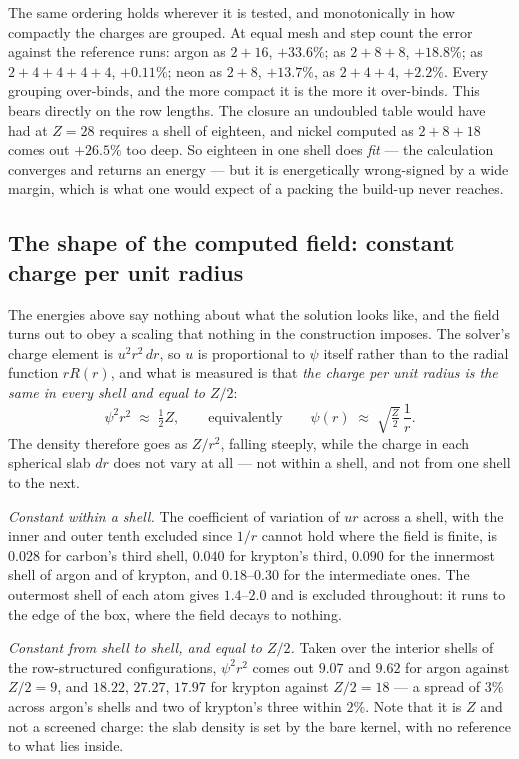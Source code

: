 \documentclass[11pt]{article}
\begin{document}
The same ordering holds wherever it is tested, and monotonically in how compactly the charges are
grouped. At equal mesh and step count the error against the reference runs: argon as $2{+}16$,
$+33.6\%$; as $2{+}8{+}8$, $+18.8\%$; as $2{+}4{+}4{+}4{+}4$, $+0.11\%$; neon as $2{+}8$, $+13.7\%$,
as $2{+}4{+}4$, $+2.2\%$. Every grouping over-binds, and the more compact it is the more it over-binds.
This bears directly on the row lengths. The closure an undoubled table would have had at $Z=28$
requires a shell of eighteen, and nickel computed as $2{+}8{+}18$ comes out $+26.5\%$ too deep. So
eighteen in one shell does \emph{fit} --- the calculation converges and returns an energy --- but it
is energetically wrong-signed by a wide margin, which is what one would expect of a packing the
build-up never reaches.

\subsection{The shape of the computed field: constant charge per unit radius}\label{sec:psiscale}

The energies above say nothing about what the solution looks like, and the field turns out to obey a
scaling that nothing in the construction imposes. The solver's charge element is $u^2r^2\,dr$, so $u$
is proportional to $\psi$ itself rather than to the radial function $rR(r)$, and what is measured is
that \emph{the charge per unit radius is the same in every shell and equal to $Z/2$}:
\[
\psi^2 r^2 \;\approx\; \tfrac12 Z ,
\qquad\text{equivalently}\qquad
\psi(r) \;\approx\; \sqrt{\tfrac{Z}{2}}\,\frac1r .
\]
The density therefore goes as $Z/r^2$, falling steeply, while the charge in each spherical slab
$dr$ does not vary at all --- not within a shell, and not from one shell to the next.

\emph{Constant within a shell.} The coefficient of variation of $ur$ across a shell, with the inner
and outer tenth excluded since $1/r$ cannot hold where the field is finite, is $0.028$ for carbon's
third shell, $0.040$ for krypton's third, $0.090$ for the innermost shell of argon and of krypton,
and $0.18$--$0.30$ for the intermediate ones. The outermost shell of each atom gives $1.4$--$2.0$
and is excluded throughout: it runs to the edge of the box, where the field decays to nothing.

\emph{Constant from shell to shell, and equal to $Z/2$.} Taken over the interior shells of the
row-structured configurations, $\psi^2r^2$ comes out $9.07$ and $9.62$ for argon against $Z/2=9$, and
$18.22$, $27.27$, $17.97$ for krypton against $Z/2=18$ --- a spread of $3\%$ across argon's shells and
two of krypton's three within $2\%$. Note that it is $Z$ and not a screened charge: the slab density
is set by the bare kernel, with no reference to what lies inside.
\end{document}
